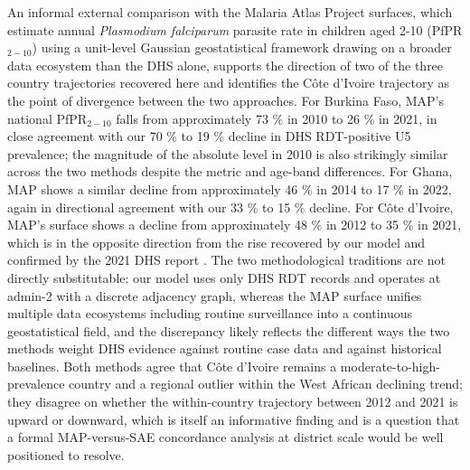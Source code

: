 \documentclass{article}
\begin{document}
An informal external comparison with the Malaria Atlas Project surfaces,
which estimate annual \emph{Plasmodium falciparum} parasite rate in
children aged 2-10 (PfPR\(_{2-10}\)) using a unit-level Gaussian
geostatistical framework drawing on a broader data ecosystem than the
DHS alone, supports the direction of two of the three country
trajectories recovered here and identifies the Côte d'Ivoire trajectory
as the point of divergence between the two approaches. For Burkina Faso,
MAP's national PfPR\(_{2-10}\) falls from approximately 73 \% in 2010 to
26 \% in 2021, in close agreement with our 70 \% to 19 \% decline in DHS
RDT-positive U5 prevalence; the magnitude of the absolute level in 2010
is also strikingly similar across the two methods despite the metric and
age-band differences. For Ghana, MAP shows a similar decline from
approximately 46 \% in 2014 to 17 \% in 2022, again in directional
agreement with our 33 \% to 15 \% decline. For Côte d'Ivoire, MAP's
surface shows a decline from approximately 48 \% in 2012 to 35 \% in
2021, which is in the opposite direction from the rise recovered by our
model and confirmed by the 2021 DHS report \citep{civdhs2021}. The two
methodological traditions are not directly substitutable: our model uses
only DHS RDT records and operates at admin-2 with a discrete adjacency
graph, whereas the MAP surface unifies multiple data ecosystems
including routine surveillance into a continuous geostatistical field,
and the discrepancy likely reflects the different ways the two methods
weight DHS evidence against routine case data and against historical
baselines. Both methods agree that Côte d'Ivoire remains a
moderate-to-high-prevalence country and a regional outlier within the
West African declining trend; they disagree on whether the
within-country trajectory between 2012 and 2021 is upward or downward,
which is itself an informative finding and is a question that a formal
MAP-versus-SAE concordance analysis at district scale would be well
positioned to resolve.
\end{document}
